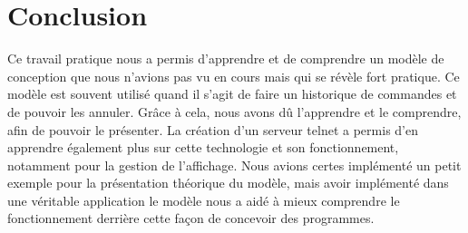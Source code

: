 \documentclass[french]{article}
\begin{document}
	\section{Conclusion}
	Ce travail pratique nous a permis d'apprendre et de comprendre un modèle de conception que nous n'avions pas vu en cours mais qui se révèle fort pratique. Ce modèle est souvent utilisé quand il s'agit de faire un historique de commandes et de pouvoir les annuler. Grâce à cela, nous avons dû l'apprendre et le comprendre, afin de pouvoir le présenter. La création d'un serveur telnet a permis d'en apprendre également plus sur cette technologie et son fonctionnement, notamment pour la gestion de l'affichage. Nous avions certes implémenté un petit exemple pour la présentation théorique du modèle, mais avoir implémenté dans une véritable application le modèle nous a aidé à mieux comprendre le fonctionnement derrière cette façon de concevoir des programmes.
\end{document}
